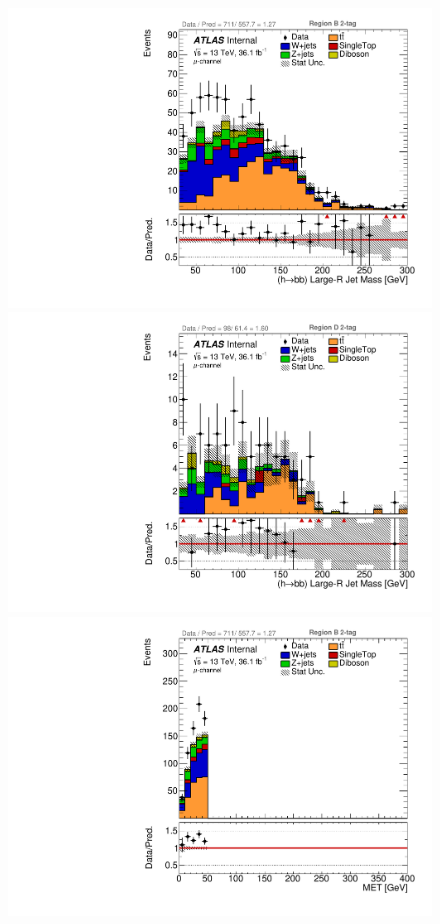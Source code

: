 \begin{figure}[!htbp]
\begin{center}
\includegraphics[scale=0.33]{./figures/boosted/ABCD_ScaledPrompt/muon_Inc_RegionB_HbbMass}
\includegraphics[scale=0.33]{./figures/boosted/ABCD_ScaledPrompt/muon_Inc_RegionD_HbbMass}\\
\includegraphics[scale=0.33]{./figures/boosted/ABCD_ScaledPrompt/muon_Inc_RegionB_MET}    \\

\end{center}
\end{figure}
